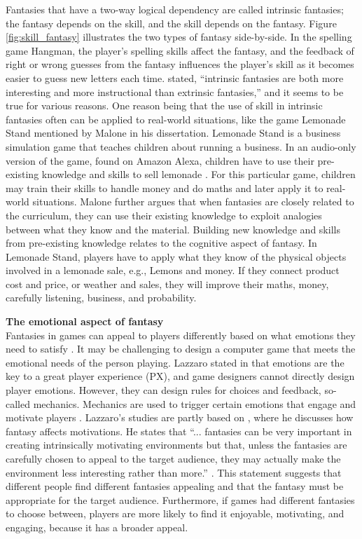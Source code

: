 \documentclass[../Main.tex]{subfiles}
\begin{document}
Fantasies that have a two-way logical dependency are called intrinsic fantasies; the fantasy depends on the skill, and the skill depends on the fantasy. Figure \ref{fig:skill_fantasy} illustrates the two types of fantasy side-by-side. In the spelling game Hangman, the player’s spelling skills affect the fantasy, and the feedback of right or wrong guesses from the fantasy influences the player's skill as it becomes easier to guess new letters each time. \citet{malone_what_1980} stated, “intrinsic fantasies are both more interesting and more instructional than extrinsic fantasies,” and it seems to be true for various reasons. One reason being that the use of skill in intrinsic fantasies often can be applied to real-world situations, like the game Lemonade Stand mentioned by Malone in his \citeyear{malone_what_1980} dissertation. Lemonade Stand is a business simulation game that teaches children about running a business.  In an audio-only version of the game, found on Amazon Alexa, children have to use their pre-existing knowledge and skills to sell lemonade \citep{einhorn_amazoncom_2019}. For this particular game, children may train their skills to handle money and do maths and later apply it to real-world situations. Malone further argues that when fantasies are closely related to the curriculum, they can use their existing knowledge to exploit analogies between what they know and the material. Building new knowledge and skills from pre-existing knowledge relates to the cognitive aspect of fantasy. In Lemonade Stand, players have to apply what they know of the physical objects involved in a lemonade sale, e.g., Lemons and money. If they connect product cost and price, or weather and sales, they will improve their maths, money, carefully listening, business, and probability.

\textbf{The emotional aspect of fantasy} \\
Fantasies in games can appeal to players differently based on what emotions they need to satisfy \citep{malone_what_1980}. It may be challenging to design a computer game that meets the emotional needs of the person playing. Lazzaro stated in  \citeyear{lazzaro_four_2008} that emotions are the key to a great player experience (PX), and game designers cannot directly design player emotions. However, they can design rules for choices and feedback, so-called mechanics. Mechanics are used to trigger certain emotions that engage and motivate players \citep{lazzaro_four_2008}.
Lazzaro’s studies are partly based on \citet{malone_heuristics_1982}, where he discusses how fantasy affects motivations. He states that “... fantasies can be very important in creating intrinsically motivating environments but that, unless the fantasies are carefully chosen to appeal to the target audience, they may actually make the environment less interesting rather than more.” \citep{malone_heuristics_1982}. This statement suggests that different people find different fantasies appealing and that the fantasy must be appropriate for the target audience. Furthermore, if games had different fantasies to choose between, players are more likely to find it enjoyable, motivating, and engaging, because it has a broader appeal.
\end{document}
